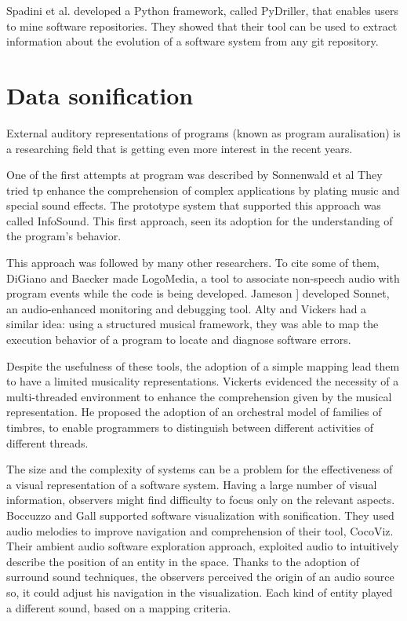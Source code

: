Spadini et al. \cite{Spadini2018} developed a Python framework, called PyDriller, that enables users to mine software repositories. 
They showed that their tool can be used to extract information about the evolution of a software system from any git repository.  

\newpage

\section{Data sonification}

External auditory representations of programs (known as program auralisation) is a researching field that 
is getting even more interest in the recent years.

One of the first attempts at program was described by Sonnenwald et al \cite{Sonnenwald1990}
They tried tp enhance the comprehension of complex applications by plating music and special sound effects. 
The prototype system that supported this approach was called InfoSound.
This first approach, seen its adoption for the understanding of the program's behavior. 

This approach was followed by many other researchers. To cite some of them, DiGiano and Baecker \cite{DiGiano1993} made LogoMedia, a tool to associate non-speech audio with program events while the code is being developed. 
Jameson \cite{Jameson1994}] developed Sonnet, an audio-enhanced monitoring and debugging tool.  
Alty and Vickers \cite{Vickers2003} had a similar idea: using a structured musical framework, they was able to map the execution behavior of a program to locate and diagnose software errors. 

Despite the usefulness of these tools, the adoption of a simple mapping lead them to have a limited musicality representations.  
Vickerts \cite{Vickers2004} evidenced the necessity of a multi-threaded environment to enhance the comprehension given by the musical representation. 
He proposed the adoption of an orchestral model of families of timbres, to enable programmers to distinguish between different activities of different threads.


The size and the complexity of systems can be a problem for the effectiveness of a visual representation of a software system.
Having a large number of visual information, observers might find difficulty to focus only on the relevant aspects. 
Boccuzzo and Gall \cite{Boccuzzo2009} supported software visualization with sonification. 
They used audio melodies to improve navigation and comprehension of their tool, CocoViz.
Their ambient audio software exploration approach, exploited audio to intuitively describe the position of an entity in the space. 
Thanks to the adoption of surround sound techniques, the observers perceived the origin of an audio source so, it could adjust his navigation in the visualization.
Each kind of entity played a different sound, based on a mapping criteria.

